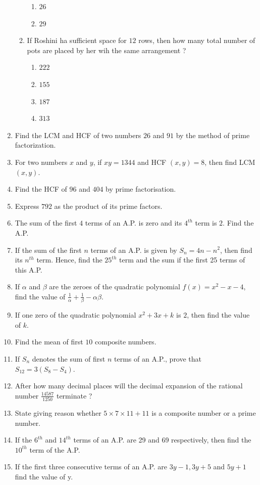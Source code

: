 \begin{enumerate}
\begin{enumerate}[label=(\roman*)]
\begin{enumerate}[label=\Alph*]
					\item $26$
					\item $29$
				\end{enumerate}
			\item If Roshini ha sufficient space for $12$ rows, then how many total number of pots are placed by her wih the same arrangement ?
				\begin{enumerate}[label=\Alph*]
					\item $222$
					\item $155$
					\item $187$
					\item $313$
				\end{enumerate}
		\end{enumerate} 

	\item Find the LCM and HCF of two numbers $26$ and $91$ by the method of prime factorization.
	\item For two numbers $x$ and $y$, if $xy = 1344$ and HCF $(x,y) = 8$, then find LCM$(x, y)$.
	\item Find the HCF of $96$ and $404$ by prime factorisation.
	\item Express $792$ as the product of its prime factors.
	\item The sum of the first $4$ terms of an A.P. is zero and its $4^{th}$ term is $2$. Find the A.P.
	\item If the sum of the first $n$ terms of an A.P. is given by $S_n = 4n - n^2$, then find its $n^{th}$ term. Hence, find the $25^{th}$ term and the sum if the first 25 terms of this A.P.
	\item If $\alpha$ and $\beta$ are the zeroes of the quadratic polynomial $f(x) = x^{2} - x - 4$, find the value of $\frac{1}{\alpha} + \frac{1}{\beta} - {\alpha \beta}$.
	\item If one zero of the quadratic polynomial $x^{2} +  3x + k$ is $2$, then find the value of $k$.
	\item Find the mean of first $10$ composite numbers.
	\item If $S_n$ denotes the sum of first $n$ terms of an A.P., prove that $S_{12} = 3(S_8 - S_4)$.
	\item After how many decimal places will the decimal expansion of the rational number $\frac{14587}{1250}$ terminate ?			
	\item State giving reason whether $5\times 7\times 11 +11$ is a composite number or a prime number.
	\item If the $6^{th}$ and $14^{th}$ terms of an A.P. are 29 and 69 respectively, then find the $10^{th}$ term of the A.P.
	\item If the first three consecutive terms of an A.P. are $3y-1, 3y+5$ and $5y+1$ find the value of y. 
\end{enumerate}
